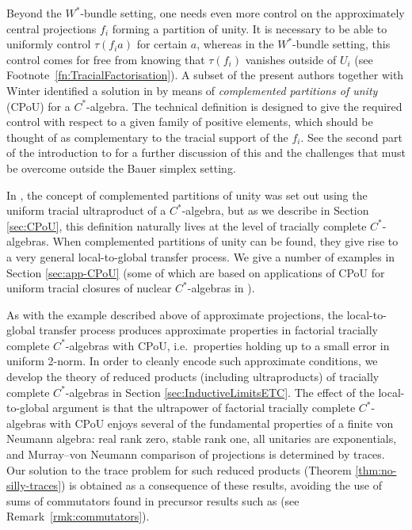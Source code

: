 \documentclass[a4paper,11pt]{amsart}
\theoremstyle{definition}
\numberwithin{equation}{section}
\numberwithin{theorem}{section}
\begin{document}
Beyond the $W^*$-bundle setting, one needs even more control on the approximately central projections $f_i$ forming a partition of unity.
It is necessary to be able to uniformly control $\tau(f_ia)$ for certain $a$, whereas in the $W^*$-bundle setting, this control comes for free from knowing that $\tau(f_i)$ vanishes outside of $U_i$ (see Footnote~\ref{fn:TracialFactorisation}). A subset of the present authors together with Winter identified a solution in \cite{CETWW} by means of \emph{complemented partitions of unity} (CPoU) for a $C^*$-algebra.  The technical definition is designed to give the required control with respect to a given family of positive elements, which should be thought of as complementary to the tracial support of the $f_i$. See the second part of the introduction to \cite{CETWW} for a further discussion of this and the challenges that must be overcome outside the Bauer simplex setting.


In \cite{CETWW}, the concept of complemented partitions of unity was set out using the uniform tracial ultraproduct of a $C^*$-algebra, but as we describe in Section \ref{sec:CPoU}, this definition naturally lives at the level of tracially complete $C^*$-algebras. When complemented partitions of unity can be found, they give rise to a very general local-to-global transfer process.  We give a number of examples in Section \ref{sec:app-CPoU} (some of which are based on applications of CPoU for uniform tracial closures of nuclear $C^*$-algebras in \cite{CETW,CETW-classification}). 

As with the example described above of approximate projections, the local-to-global transfer process produces approximate properties in factorial tracially complete $C^*$-algebras with CPoU, i.e.\ properties holding up to a small error in uniform 2-norm.  In order to cleanly encode such approximate conditions, we develop the theory of reduced products (including ultraproducts) of tracially complete $C^*$-algebras in Section \ref{sec:InductiveLimitsETC}. The effect of the local-to-global argument is that the ultrapower of factorial tracially complete $C^*$-algebras with CPoU enjoys several of the fundamental properties of a finite von Neumann algebra: real rank zero, stable rank one, all unitaries are exponentials, and Murray--von Neumann comparison of projections is determined by traces.  Our solution to the trace problem for such reduced products (Theorem \ref{thm:no-silly-traces}) is obtained as a consequence of these results, avoiding the use of sums of commutators found in precursor results such as \cite[Section 3.4]{BBSTWW} (see Remark~\ref{rmk:commutators}).
\end{document}
